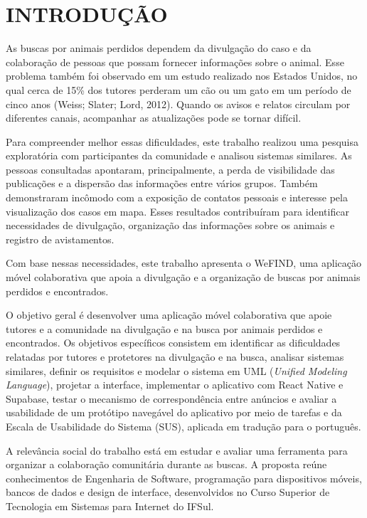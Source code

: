 \section{INTRODUÇÃO}

As buscas por animais perdidos dependem da divulgação do caso e da colaboração de pessoas que possam fornecer informações sobre o animal. Esse problema também foi observado em um estudo realizado nos Estados Unidos, no qual cerca de 15\% dos tutores perderam um cão ou um gato em um período de cinco anos (Weiss; Slater; Lord, 2012). Quando os avisos e relatos circulam por diferentes canais, acompanhar as atualizações pode se tornar difícil.

Para compreender melhor essas dificuldades, este trabalho realizou uma pesquisa exploratória com participantes da comunidade e analisou sistemas similares. As pessoas consultadas apontaram, principalmente, a perda de visibilidade das publicações e a dispersão das informações entre vários grupos. Também demonstraram incômodo com a exposição de contatos pessoais e interesse pela visualização dos casos em mapa. Esses resultados contribuíram para identificar necessidades de divulgação, organização das informações sobre os animais e registro de avistamentos.

Com base nessas necessidades, este trabalho apresenta o WeFIND, uma aplicação móvel colaborativa que apoia a divulgação e a organização de buscas por animais perdidos e encontrados.

O objetivo geral é desenvolver uma aplicação móvel colaborativa que apoie tutores e a comunidade na divulgação e na busca por animais perdidos e encontrados. Os objetivos específicos consistem em identificar as dificuldades relatadas por tutores e protetores na divulgação e na busca, analisar sistemas similares, definir os requisitos e modelar o sistema em UML (\textit{Unified Modeling Language}), projetar a interface, implementar o aplicativo com React Native e Supabase, testar o mecanismo de correspondência entre anúncios e avaliar a usabilidade de um protótipo navegável do aplicativo por meio de tarefas e da Escala de Usabilidade do Sistema (SUS), aplicada em tradução para o português.

A relevância social do trabalho está em estudar e avaliar uma ferramenta para organizar a colaboração comunitária durante as buscas. A proposta reúne conhecimentos de Engenharia de Software, programação para dispositivos móveis, bancos de dados e design de interface, desenvolvidos no Curso Superior de Tecnologia em Sistemas para Internet do IFSul.

